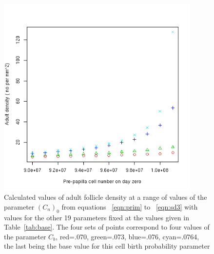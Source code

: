 %

\begin{figure}[!h]
  \centering
   \includegraphics[width=0.9\textwidth]{zcellnodens.png}
  \caption{Calculated values of adult follicle density at a range of values of the parameter $(C_{n})_{0}$  from equations ~\ref{eqn:prim} to ~\ref{eqn:sd3} with values for the other 19  parameters fixed at the values given in Table~\ref{tab:base}. The four sets of points correspond to four values of the parameter $C_{b}$, red=.070, green=.073, blue=.076, cyan=.0764, the last being the base value for this cell birth probability parameter}
  \label{fig:zcellnodens}
\end{figure}

%

